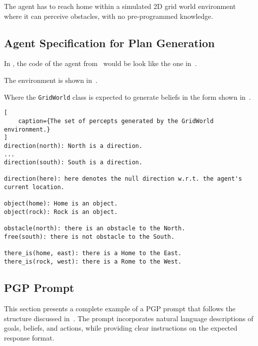 \documentclass[12pt,a4paper,openright,twoside]{book}
\begin{document}
The agent has to reach home within a simulated 2D grid world environment where it can perceive obstacles, with no pre-programmed knowledge.

\subsection{Agent Specification for Plan Generation}

In \jakta{}, the code of the agent from~ would be look like the one in~.
%


The environment is shown in~.



Where the \verb|GridWorld| class is expected to generate beliefs in the form shown in~.

\begin{lstlisting}[
    caption={The set of percepts generated by the GridWorld environment.}
]
direction(north): North is a direction.
...
direction(south): South is a direction.

direction(here): here denotes the null direction w.r.t. the agent's current location.

object(home): Home is an object.
object(rock): Rock is an object.

obstacle(north): there is an obstacle to the North.
free(south): there is not obstacle to the South.

there_is(home, east): there is a Home to the East.
there_is(rock, west): there is a Rome to the West.
\end{lstlisting}

\subsection{\acs{PGP} Prompt}\label{app:prompt}

This section presents a complete example of a \ac{PGP} prompt that follows the structure discussed in~. 
%
The prompt incorporates natural language descriptions of goals, beliefs, and actions, while providing clear instructions on the expected response format.
\end{document}
